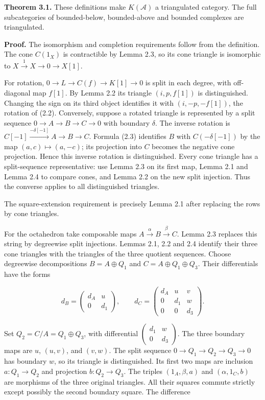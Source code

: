 \documentclass[
  english,
  11pt,
  a4paper,
]{article}
\begin{document}
\textbf{Theorem 3.1.} These definitions make \(K(\mathcal A)\) a
triangulated category. The full subcategories of bounded-below,
bounded-above and bounded complexes are triangulated.

\textbf{Proof.} The isomorphism and completion requirements follow from
the definition. The cone \(C(1_X)\) is contractible by Lemma 2.3, so its
cone triangle is isomorphic to \(X\xrightarrow1X\to0\to X[1]\).

For rotation, \(0\to L\to C(f)\to K[1]\to0\) is split in each degree,
with off-diagonal map \(f[1]\). By Lemma 2.2 its triangle \((i,p,f[1])\)
is distinguished. Changing the sign on its third object identifies it
with \((i,-p,-f[1])\), the rotation of (2.2). Conversely, suppose a
rotated triangle is represented by a split sequence
\(0\to A\to B\to C\to0\) with boundary \(\delta\). The inverse rotation
is \(C[-1]\xrightarrow{-\delta[-1]}A\to B\to C\). Formula (2.3)
identifies \(B\) with \(C(-\delta[-1])\) by the map
\((a,c)\mapsto(a,-c)\); its projection into \(C\) becomes the negative
cone projection. Hence this inverse rotation is distinguished. Every
cone triangle has a split-sequence representative: use Lemma 2.3 on its
first map, Lemma 2.1 and Lemma 2.4 to compare cones, and Lemma 2.2 on
the new split injection. Thus the converse applies to all distinguished
triangles.

The square-extension requirement is precisely Lemma 2.1 after replacing
the rows by cone triangles.

For the octahedron take composable maps
\(A\xrightarrow\alpha B\xrightarrow\beta C\). Lemma 2.3 replaces this
string by degreewise split injections. Lemmas 2.1, 2.2 and 2.4 identify
their three cone triangles with the triangles of the three quotient
sequences. Choose degreewise decompositions \(B=A\oplus Q_1\) and
\(C=A\oplus Q_1\oplus Q_3\). Their differentials have the forms

\[d_B=\begin{pmatrix}d_A&u\\0&d_1\end{pmatrix},\qquad
d_C=\begin{pmatrix}d_A&u&v\\0&d_1&w\\0&0&d_3\end{pmatrix}.
\tag{3.1}\]

Set \(Q_2=C/A=Q_1\oplus Q_3\), with differential
\(\left(\begin{smallmatrix}d_1&w\\0&d_3\end{smallmatrix}\right)\). The
three boundary maps are \(u\), \((u,v)\), and \((v,w)\). The split
sequence \(0\to Q_1\to Q_2\to Q_3\to0\) has boundary \(w\), so its
triangle is distinguished. Its first two maps are inclusion
\(a:Q_1\to Q_2\) and projection \(b:Q_2\to Q_3\). The triples
\((1_A,\beta,a)\) and \((\alpha,1_C,b)\) are morphisms of the three
original triangles. All their squares commute strictly except possibly
the second boundary square. The difference
\end{document}
